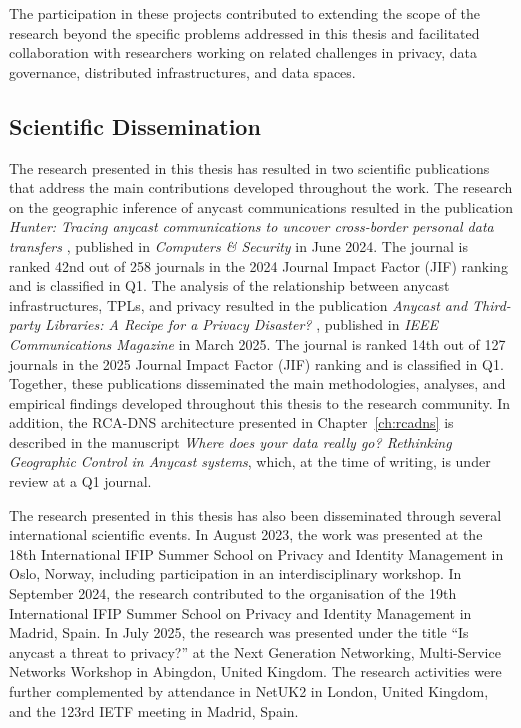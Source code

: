 \documentclass[
A4paper,                %
twoside,                %
openright,              %
chapterprefix=true,     %
12pt,                   %
headings=normal,        %
titlepage=on            %
]{book}
\begin{document}
The participation in these projects contributed to extending the scope of the research beyond the specific problems addressed in this thesis and facilitated collaboration with researchers working on related challenges in privacy, data governance, distributed infrastructures, and data spaces.

\subsection{Scientific Dissemination}
\label{sc:conclusion_dissemination}

The research presented in this thesis has resulted in two scientific publications that address the main contributions developed throughout the work. The research on the geographic inference of anycast communications resulted in the publication \emph{Hunter: Tracing anycast communications to uncover cross-border personal data transfers} \cite{Pascual2024Hunter:Transfers}, published in \emph{Computers \& Security} in June 2024. The journal is ranked 42nd out of 258 journals in the 2024 Journal Impact Factor (JIF) ranking and is classified in Q1. The analysis of the relationship between anycast infrastructures, TPLs, and privacy resulted in the publication \emph{Anycast and Third-party Libraries: A Recipe for a Privacy Disaster?} \cite{Pascual2025AnycastDisaster}, published in \emph{IEEE Communications Magazine} in March 2025. The journal is ranked 14th out of 127 journals in the 2025 Journal Impact Factor (JIF) ranking and is classified in Q1. Together, these publications disseminated the main methodologies, analyses, and empirical findings developed throughout this thesis to the research community. In addition, the RCA-DNS architecture presented in Chapter~\ref{ch:rcadns} is described in the manuscript \emph{Where does your data really go? Rethinking Geographic Control in Anycast systems}, which, at the time of writing, is under review at a Q1 journal.

The research presented in this thesis has also been disseminated through several international scientific events. In August 2023, the work was presented at the 18th International IFIP Summer School on Privacy and Identity Management in Oslo, Norway, including participation in an interdisciplinary workshop. In September 2024, the research contributed to the organisation of the 19th International IFIP Summer School on Privacy and Identity Management in Madrid, Spain. In July 2025, the research was presented under the title ``Is anycast a threat to privacy?'' at the Next Generation Networking, Multi-Service Networks Workshop in Abingdon, United Kingdom. The research activities were further complemented by attendance in NetUK2 in London, United Kingdom, and the 123rd IETF meeting in Madrid, Spain.
\end{document}
